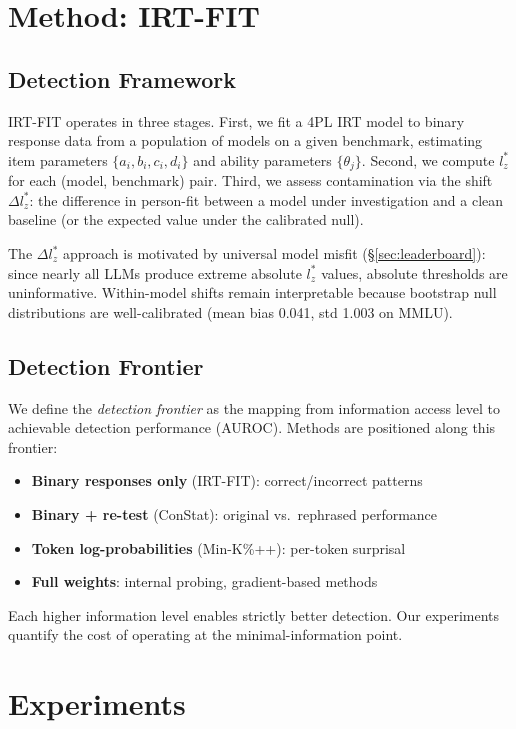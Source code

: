 \documentclass[11pt,a4paper]{article}
\begin{document}
\section{Method: IRT-FIT}

\subsection{Detection Framework}

IRT-FIT operates in three stages.
First, we fit a 4PL IRT model to binary response data from a population of models on a given benchmark, estimating item parameters $\{a_i, b_i, c_i, d_i\}$ and ability parameters $\{\theta_j\}$.
Second, we compute $l_{z}^{*}$ for each (model, benchmark) pair.
Third, we assess contamination via the shift $\Delta l_{z}^{*}$: the difference in person-fit between a model under investigation and a clean baseline (or the expected value under the calibrated null).

The $\Delta l_{z}^{*}$ approach is motivated by universal model misfit (\S\ref{sec:leaderboard}): since nearly all LLMs produce extreme absolute $l_{z}^{*}$ values, absolute thresholds are uninformative.
Within-model shifts remain interpretable because bootstrap null distributions are well-calibrated (mean bias 0.041, std 1.003 on MMLU).

\subsection{Detection Frontier}

We define the \emph{detection frontier} as the mapping from information access level to achievable detection performance (AUROC).
Methods are positioned along this frontier:
\begin{itemize}
\item \textbf{Binary responses only} (IRT-FIT): correct/incorrect patterns
\item \textbf{Binary + re-test} (ConStat): original vs.\ rephrased performance
\item \textbf{Token log-probabilities} (Min-K\%++): per-token surprisal
\item \textbf{Full weights}: internal probing, gradient-based methods
\end{itemize}
Each higher information level enables strictly better detection.
Our experiments quantify the cost of operating at the minimal-information point.

\section{Experiments}
\end{document}
